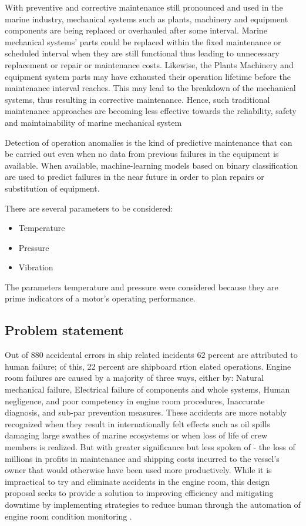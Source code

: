 With preventive and corrective maintenance still pronounced and used in the marine industry, mechanical systems such as plants, machinery and equipment components are being replaced or overhauled after some interval. Marine mechanical systems’ parts could be replaced within the fixed maintenance or scheduled interval when they are still functional thus leading to unnecessary replacement or repair or maintenance costs. Likewise, the Plants Machinery and equipment system parts may have exhausted their operation lifetime before the maintenance interval reaches. This may lead to the breakdown of the mechanical systems, thus resulting in corrective maintenance. Hence, such traditional maintenance approaches are becoming less effective towards the reliability, safety and maintainability of marine mechanical system 

Detection of operation anomalies is the kind of predictive maintenance that can be carried out even when no data from previous failures in the equipment is available. When available, machine-learning models based on binary classification are used to predict failures in the near future in order to plan repairs or substitution of equipment\cite{han_motor_2019}.

There are several parameters to be considered:
\begin{itemize}
	\item Temperature 
	\item Pressure
	\item Vibration
\end{itemize} 






The parameters temperature and pressure were considered because they are prime indicators of a motor’s operating performance. 

\subsection{Problem  statement}
 Out of 880 accidental errors in ship related incidents 62 percent are attributed to human failure; of this, 22 percent are shipboard rtion elated operations. Engine room failures are caused by a majority of three ways, either by: Natural mechanical failure, Electrical failure of components and whole systems, Human negligence, and poor competency in engine room procedures, Inaccurate diagnosis, and sub-par prevention measures. These accidents are more notably recognized when they result in internationally felt effects such as oil spills damaging large swathes of marine ecosystems or when loss of life of crew members is realized. But with greater significance but less spoken of - the loss of millions in profits in maintenance and shipping costs incurred to the vessel’s owner that would otherwise have been used more productively. While it is impractical to try and eliminate accidents in the engine room, this design proposal seeks to provide a solution to improving efficiency and mitigating downtime by implementing strategies to reduce human through the automation of engine room condition monitoring \cite{noauthor_13_nodate}. 


